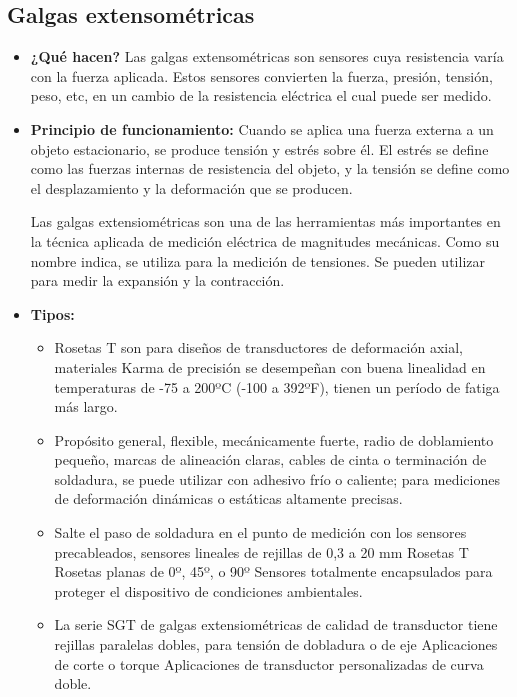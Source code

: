 \subsection*{Galgas extensométricas}
\begin{itemize}
	\item \textbf{¿Qué hacen?} Las galgas extensométricas son sensores cuya resistencia varía con la fuerza aplicada. Estos sensores convierten la fuerza, presión, tensión, peso, etc, en un cambio de la resistencia eléctrica el cual puede ser medido.
	\item \textbf{Principio de funcionamiento:} Cuando se aplica una fuerza externa a un objeto estacionario, se produce tensión y estrés sobre él. El estrés se define como las fuerzas internas de resistencia del objeto, y la tensión se define como el desplazamiento y la deformación que se producen.
	
	Las galgas extensiométricas son una de las herramientas más importantes en la técnica aplicada de medición eléctrica de magnitudes mecánicas. Como su nombre indica, se utiliza para la medición de tensiones. Se pueden utilizar para medir la expansión y la contracción.
	\item \textbf{Tipos:}
	\begin{itemize}
		\item {} Rosetas T son para diseños de transductores de deformación axial, materiales Karma de precisión se desempeñan con buena linealidad en temperaturas de -75 a 200ºC (-100 a 392ºF), tienen un período de fatiga más largo.
		\item {} Propósito general, flexible, mecánicamente fuerte, radio de doblamiento pequeño, marcas de alineación claras, cables de cinta o terminación de soldadura, se puede utilizar con adhesivo frío o caliente; para mediciones de deformación dinámicas o estáticas altamente precisas.
		\item {} Salte el paso de soldadura en el punto de medición con los sensores precableados, sensores lineales de rejillas de 0,3 a 20 mm
		Rosetas T
		Rosetas planas de 0º, 45º, o 90º
		Sensores totalmente encapsulados para proteger el dispositivo de condiciones ambientales.
		\item {} La serie SGT de galgas extensiométricas de calidad de transductor tiene rejillas paralelas dobles, para tensión de dobladura o de eje
		Aplicaciones de corte o torque
		Aplicaciones de transductor personalizadas de curva doble. \cite{Omega_GalgasExtensiometricas}
	\end{itemize}
\end{itemize}

